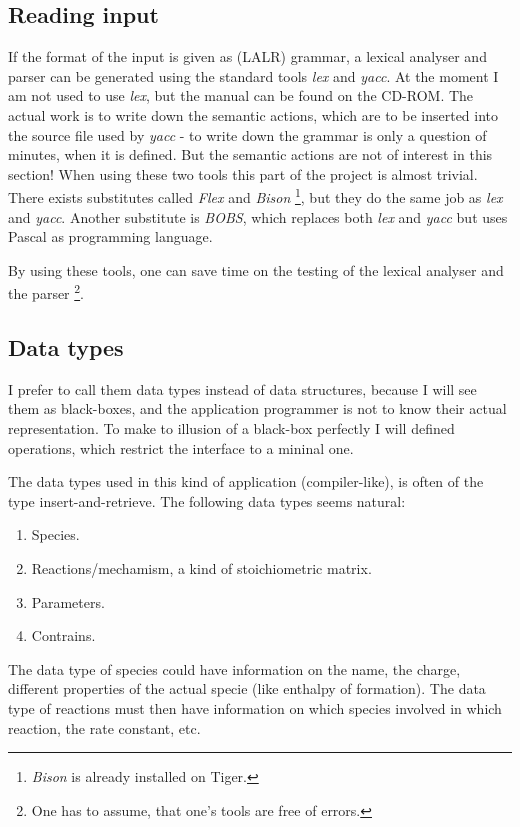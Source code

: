 \subsection{Reading input}
If the format of the input is given as (LALR) grammar, a lexical analyser
and parser can be generated using the standard tools {\em lex} and {\em
yacc}. At the moment I am not used to use {\em lex}, but the
manual can be found on the CD-ROM. The actual work is to write down
the semantic actions, which are to be inserted into the source file
used by {\em yacc} - to write down the grammar is only a question of
minutes, when it is defined. 
But the semantic actions are not of interest in this section! When 
using these two tools 
this part of
the project is almost trivial. 
There exists substitutes called {\em Flex} and {\em Bison}
\footnote{{\em Bison} is already installed on Tiger.}, but they
do the same job as {\em lex} and {\em yacc}. Another substitute
is {\em BOBS}, which replaces both {\em lex} and {\em yacc} but uses
Pascal as programming language.

By using these tools, one can save time
on the testing of the lexical analyser and the parser \footnote{One
has to assume, that one's tools are free of errors.}. 

\subsection{Data types}
I prefer to call them data types instead of data structures, because I will
see them as black-boxes, and the application programmer is not to know
their actual representation. To make to illusion of a black-box perfectly
I will defined operations, which restrict the interface to a mininal one.

The data types used in this kind of application (compiler-like), is
often of the type insert-and-retrieve. The following data types seems
natural:
\begin{enumerate}
 \item Species.
 \item Reactions/mechamism, a kind of stoichiometric matrix.
 \item Parameters.
 \item Contrains.
\end{enumerate}

The data type of species could have information on the name, the charge, 
different properties of the actual specie (like enthalpy of formation). 
The data type of reactions must then have information on which species 
involved in which reaction, the rate constant, etc. 


